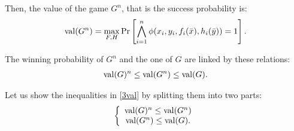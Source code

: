 Then, the value of the game $G^n$, that is the success probability is:\begin{align*}
\mathrm{val} (G^n) =\max_{F,H}\Pr \left[\bigwedge\limits_{i=1}^n \phi (x_i,y_i, f_i(\bar{x}), h_i(\bar{y}))=1 \right].
\end{align*}

 
The winning probability of $G^n$ and the one of $G$ are linked by these relations: \begin{align} \mathrm{val} (G)^n \leq \mathrm{val} (G^n) \leq \mathrm{val} (G). \label{3val}\end{align}

Let us show the inequalities in \eqref{3val} by splitting them into two parts: 
\begin{align}
\left\lbrace \begin{array}{c} \mathrm{val} (G)^n \leq \mathrm{val} (G^n) \\ \mathrm{val} (G^n) \leq \mathrm{val} (G).  \end{array}\right.
\end{align}

